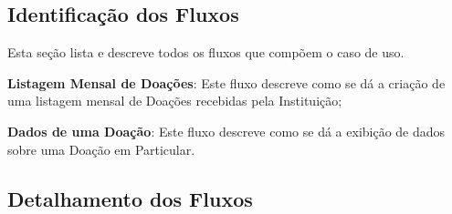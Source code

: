 \subsection*{Identificação dos Fluxos}
Esta seção lista e descreve todos os fluxos que compõem o caso de uso.
\begin{lista}
  \item \textbf{Listagem Mensal de Doações}: Este fluxo descreve como se dá a criação de uma listagem mensal de Doações recebidas pela Instituição;
  \item \textbf{Dados de uma Doação}: Este fluxo descreve como se dá a exibição de dados sobre uma Doação em Particular.
\end{lista}

\subsection*{Detalhamento dos Fluxos}

